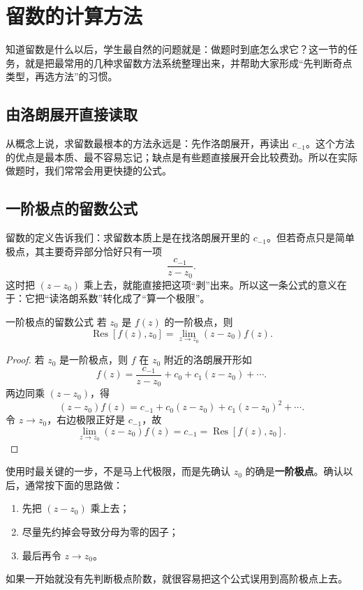 \section{留数的计算方法}

\begin{wulibj}[本节的任务]
知道留数是什么以后，学生最自然的问题就是：做题时到底怎么求它？这一节的任务，就是把最常用的几种求留数方法系统整理出来，并帮助大家形成``先判断奇点类型，再选方法''的习惯。
\end{wulibj}

\subsection{由洛朗展开直接读取}

从概念上说，求留数最根本的方法永远是：先作洛朗展开，再读出 $c_{-1}$。这个方法的优点是最本质、最不容易忘记；缺点是有些题直接展开会比较费劲。所以在实际做题时，我们常常会用更快捷的公式。

\subsection{一阶极点的留数公式}

留数的定义告诉我们：求留数本质上是在找洛朗展开里的 $c_{-1}$。但若奇点只是简单极点，其主要奇异部分恰好只有一项
\[
    \frac{c_{-1}}{z-z_0}.
\]
这时把 $(z-z_0)$ 乘上去，就能直接把这项``剥''出来。所以这一条公式的意义在于：它把``读洛朗系数''转化成了``算一个极限''。

\begin{dingli}{一阶极点的留数公式}{}
若 $z_0$ 是 $f(z)$ 的一阶极点，则
\[
    \operatorname{Res}[f(z),z_0]
    =
    \lim_{z\to z_0}(z-z_0)f(z).
\]
\end{dingli}

\begin{proof}
若 $z_0$ 是一阶极点，则 $f$ 在 $z_0$ 附近的洛朗展开形如
\[
    f(z)=\frac{c_{-1}}{z-z_0}+c_0+c_1(z-z_0)+\cdots.
\]
两边同乘 $(z-z_0)$，得
\[
    (z-z_0)f(z)=c_{-1}+c_0(z-z_0)+c_1(z-z_0)^2+\cdots.
\]
令 $z\to z_0$，右边极限正好是 $c_{-1}$，故
\[
    \lim_{z\to z_0}(z-z_0)f(z)=c_{-1}=\operatorname{Res}[f(z),z_0].
\]
\end{proof}

\begin{tishi}[这条公式该怎样使用]
使用时最关键的一步，不是马上代极限，而是先确认 $z_0$ 的确是\textbf{一阶极点}。确认以后，通常按下面的思路做：
\begin{enumerate}
    \item 先把 $(z-z_0)$ 乘上去；
    \item 尽量先约掉会导致分母为零的因子；
    \item 最后再令 $z\to z_0$。
\end{enumerate}
如果一开始就没有先判断极点阶数，就很容易把这个公式误用到高阶极点上去。
\end{tishi}

